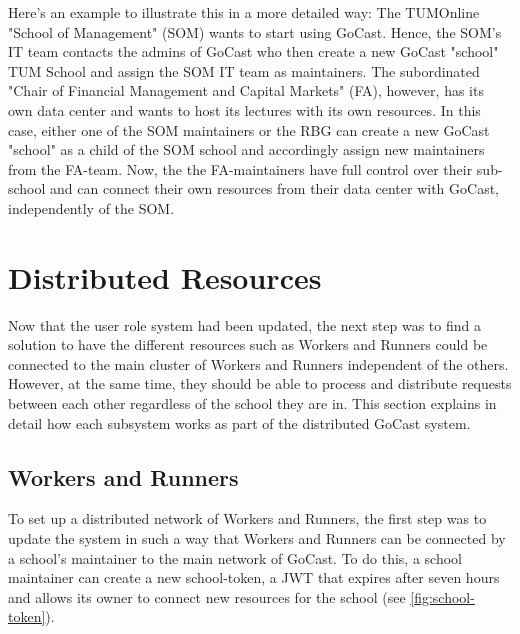 Here's an example to illustrate this in a more detailed way:
The TUMOnline "School of Management" (SOM) wants to start using GoCast. Hence, the SOM's IT team contacts the admins of GoCast who then create a new GoCast "school" TUM School and assign the SOM IT team as maintainers.
The subordinated "Chair of Financial Management and Capital Markets" (FA), however, has its own data center and wants to host its lectures with its own resources. In this case, either one of the SOM maintainers or the RBG can create a new GoCast "school" as a child of the SOM school and accordingly assign new maintainers from the FA-team. Now, the the FA-maintainers have full control over their sub-school and can connect their own resources from their data center with GoCast, independently of the SOM.











\section{Distributed Resources}

Now that the user role system had been updated, the next step was to find a solution to have the different resources such as Workers and Runners could be connected to the main cluster of Workers and Runners independent of the others. However, at the same time, they should be able to process and distribute requests between each other regardless of the school they are in. This section explains in detail how each subsystem works as part of the distributed GoCast system. 

\subsection{Workers and Runners}
To set up a distributed network of Workers and Runners, the first step was to update the system in such a way that Workers and Runners can be connected by a school's maintainer to the main network of GoCast. To do this, a school maintainer can create a new school-token, a \ac{JWT} that expires after seven hours and allows its owner to connect new resources for the school (see \autoref{fig:school-token}).

